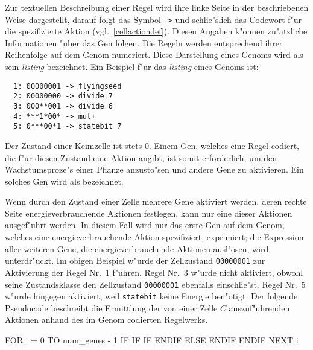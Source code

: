 Zur textuellen Beschreibung einer Regel wird ihre linke Seite in der
beschriebenen Weise dargestellt, darauf folgt das Symbol \verb|->|
und schlie"slich das Codewort f"ur die spezifizierte Aktion
(vgl.\ \ref{cellactiondef}). Diesen Angaben k"onnen zu"atzliche
Informationen "uber das Gen folgen. Die Regeln werden entsprechend ihrer
Reihenfolge auf dem Genom numeriert. Diese Darstellung eines Genoms
wird als sein {\slshape listing} bezeichnet. Ein Beispiel f"ur das
{\slshape listing} eines Genoms ist:

\begin{verbatim}
  1: 00000001 -> flyingseed
  2: 00000000 -> divide 7
  3: 000**001 -> divide 6
  4: ***1*00* -> mut+
  5: 0***00*1 -> statebit 7
\end{verbatim}

Der Zustand einer Keimzelle ist stets 0. Einem Gen, welches eine Regel codiert,
die f"ur diesen Zustand eine Aktion angibt, ist somit erforderlich, um den Wachstumsproze"s
einer Pflanze anzusto"sen und andere Gene zu aktivieren. Ein solches Gen wird als
 bezeichnet.

Wenn durch den Zustand einer Zelle mehrere Gene aktiviert werden, deren
rechte Seite energieverbrauchende Aktionen festlegen, kann nur eine dieser
Aktionen ausgef"uhrt werden. In diesem Fall wird nur das erste Gen auf dem Genom,
welches eine energieverbrauchende Aktion spezifiziert, exprimiert; die
Expression aller weiteren Gene, die energieverbrauchende Aktionen ausl"osen,
wird unterdr"uckt. Im obigen Beispiel
w"urde der Zellzustand \verb|00000001| zur Aktivierung der Regel Nr.\ 1
f"uhren. Regel Nr.\ 3 w"urde nicht aktiviert, obwohl seine Zustandsklasse
den Zellzustand \verb|00000001| ebenfalls einschlie"st. Regel Nr.\ 5 w"urde hingegen
aktiviert, weil \verb|statebit| keine Energie ben"otigt.
Der folgende Pseudocode beschreibt die Ermittlung der von einer Zelle $C$
auszuf"uhrenden Aktionen anhand des im Genom codierten Regelwerks.

\begin{verbatimcmd}
FOR i = 0 TO num_genes - 1
  IF 
    IF 
      IF 
      ENDIF
    ELSE
    ENDIF
  ENDIF
NEXT i
\end{verbatimcmd}


